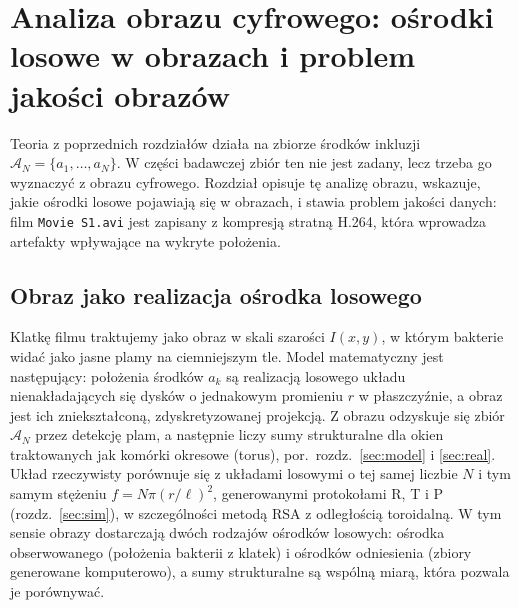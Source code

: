 \documentclass[12pt,a4paper,twoside,openright]{report}
\theoremstyle{definition}
\theoremstyle{remark}
\newcommand{\ziel}[1]{{\color{green!50!black}#1}}
\begin{document}
\chapter{\texorpdfstring{\ziel{Analiza obrazu cyfrowego: ośrodki losowe w obrazach i problem jakości obrazów}}{Analiza obrazu cyfrowego: ośrodki losowe w obrazach i problem jakości obrazów}}\label{sec:obraz}
{\color{green!50!black}
Teoria z poprzednich rozdziałów działa na zbiorze środków inkluzji $\mathcal A_N=\{a_1,\dots,a_N\}$. W części badawczej zbiór ten nie jest zadany, lecz trzeba go wyznaczyć z obrazu cyfrowego. Rozdział opisuje tę analizę obrazu, wskazuje, jakie ośrodki losowe pojawiają się w obrazach, i stawia problem jakości danych: film \texttt{Movie S1.avi} jest zapisany z kompresją stratną H.264, która wprowadza artefakty wpływające na wykryte położenia.

\section{Obraz jako realizacja ośrodka losowego}
Klatkę filmu traktujemy jako obraz w skali szarości $I(x,y)$, w którym bakterie widać jako jasne plamy na ciemniejszym tle. Model matematyczny jest następujący: położenia środków $a_k$ są realizacją losowego układu nienakładających się dysków o jednakowym promieniu $r$ w płaszczyźnie, a obraz jest ich zniekształconą, zdyskretyzowanej projekcją. Z obrazu odzyskuje się zbiór $\mathcal A_N$ przez detekcję plam, a następnie liczy sumy strukturalne dla okien traktowanych jak komórki okresowe (torus), por.\ rozdz.~\ref{sec:model} i \ref{sec:real}. Układ rzeczywisty porównuje się z układami losowymi o tej samej liczbie $N$ i tym samym stężeniu $f=N\pi(r/\ell)^2$, generowanymi protokołami R, T i P (rozdz.~\ref{sec:sim}), w szczególności metodą RSA z odległością toroidalną. W tym sensie obrazy dostarczają dwóch rodzajów ośrodków losowych: ośrodka obserwowanego (położenia bakterii z klatek) i ośrodków odniesienia (zbiory generowane komputerowo), a sumy strukturalne są wspólną miarą, która pozwala je porównywać.

}
\end{document}
